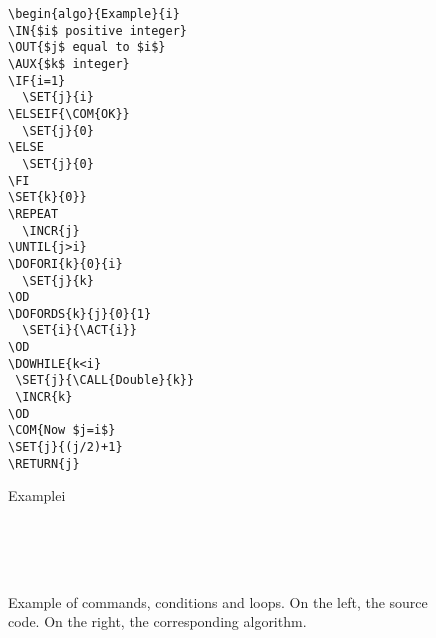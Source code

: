 \documentclass{article}
\begin{document}
\begin{figure}
\begin{center}
\begin{minipage}{.9\textwidth}
\setlength{\columnseprule}{1pt}
\begin{multicols}{2}
\verb!\begin{algo}{Example}{i}!\\
\verb!\IN{$i$ positive integer}!\\
\verb!\OUT{$j$ equal to $i$}!\\
\verb!\AUX{$k$ integer}!\\
\verb!\IF{i=1}!\\
\verb!  \SET{j}{i}!\\
\verb!\ELSEIF{\COM{OK}}!\\
\verb!  \SET{j}{0}!\\
\verb!\ELSE!\\
\verb!  \SET{j}{0}!\\
\verb!\FI!\\
\verb!\SET{k}{0}}!\\
\verb!\REPEAT!\\
\verb!  \INCR{j}!\\
\verb!\UNTIL{j>i}!\\
\verb!\DOFORI{k}{0}{i}!\\
\verb!  \SET{j}{k}!\\
\verb!\OD!\\
\verb!\DOFORDS{k}{j}{0}{1}!\\
\verb!  \SET{i}{\ACT{i}}!\\
\verb!\OD!\\
\verb!\DOWHILE{k<i}!\\
\verb! \SET{j}{\CALL{Double}{k}}!\\
\verb! \INCR{k}!\\
\verb!\OD!\\
\verb!\COM{Now $j=i$}!\\
\verb!\SET{j}{(j/2)+1}!\\
\verb!\RETURN{j}!\\
\begin{algo}[rules]{Example}{i}
\ELSE
\FI
{}
\REPEAT
\OD
{}
\OD
{}
\OD
{}
\end{algo}~\\~\\
~\\
\end{multicols}
\end{minipage}
\end{center}
\caption{\label{fig:ex}Example of commands, conditions and loops. On the left, the source code. On the right, the corresponding algorithm.} 
\end{figure}
\end{document}
